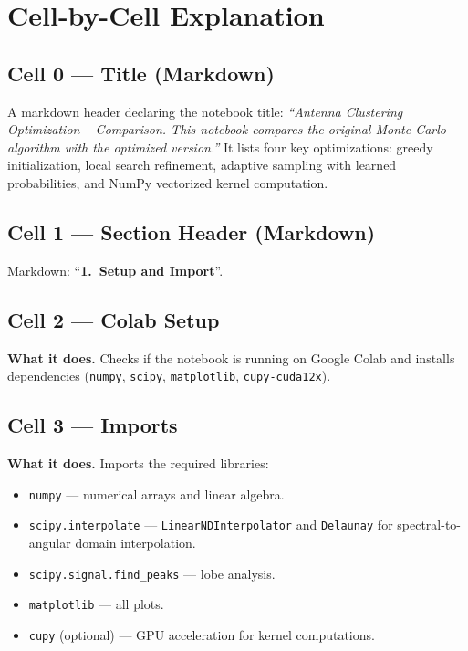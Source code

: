 \documentclass[11pt,a4paper]{article}
\begin{document}
\newpage
\section{Cell-by-Cell Explanation}

\subsection{Cell 0 --- Title (Markdown)}
A markdown header declaring the notebook title:
\emph{``Antenna Clustering Optimization -- Comparison.
This notebook compares the original Monte Carlo algorithm with the optimized
version.''} It lists four key optimizations: greedy initialization, local search
refinement, adaptive sampling with learned probabilities, and NumPy vectorized
kernel computation.

\subsection{Cell 1 --- Section Header (Markdown)}
Markdown: ``\textbf{1.\ Setup and Import}''.

\subsection{Cell 2 --- Colab Setup}

\textbf{What it does.}
Checks if the notebook is running on Google Colab and installs dependencies
(\texttt{numpy}, \texttt{scipy}, \texttt{matplotlib}, \texttt{cupy-cuda12x}).

\subsection{Cell 3 --- Imports}

\textbf{What it does.}
Imports the required libraries:
\begin{itemize}
    \item \texttt{numpy} --- numerical arrays and linear algebra.
    \item \texttt{scipy.interpolate} --- \texttt{LinearNDInterpolator} and \texttt{Delaunay}
          for spectral-to-angular domain interpolation.
    \item \texttt{scipy.signal.find\_peaks} --- lobe analysis.
    \item \texttt{matplotlib} --- all plots.
    \item \texttt{cupy} (optional) --- GPU acceleration for kernel computations.
\end{itemize}
\end{document}
